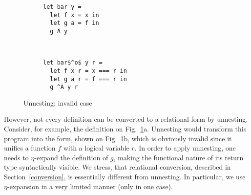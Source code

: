 \begin{figure}[t]
\centering
\begin{subfigure}[t]{0.4\textwidth}
 \centering
\begin{lstlisting}
let bar y =
  let f x = x in
  let g a = f in
  g A y
\end{lstlisting}
\vspace{-1\baselineskip}
    \caption{}
  \end{subfigure}
  ~
  \begin{subfigure}[t]{0.4\textwidth}
    \centering
\begin{lstlisting}
let bar$^o$ y r =
  let f x r = x === r in
  let g a r = f === r in
  g ^A y r
\end{lstlisting}
\vspace{-1\baselineskip}
  \caption{}
  \end{subfigure}
  \vskip2mm
\caption{Unnesting: invalid case}
\label{unnesting_invalid}
\end{figure}

However, not every definition can be converted to a relational form by unnesting. Consider, for example, the definition on Fig.~\ref{unnesting_invalid}a.
Unnesting would transform this program into the form, shown on Fig.~\ref{unnesting_invalid}b, which is obviously invalid since it unifies a
function $f$ with a logical variable $r$. In order to apply unnesting, one needs to $\eta$-expand the definition of $g$, making the functional nature of
its return type syntactically visible.
We stress, that relational conversion, described in Section~\ref{conversion}, is essentially different from unnesting. In particular, 
we use $\eta$-expansion in a very limited manner (only in one case).

\begin{comment}

and for the aforementioned example the result of relational
conversion looks as follows:

\begin{lstlisting}
   let bar$^o$ y =
     let f x = x in
     let g a = f in
     g (fun q. q === ^A) y
\end{lstlisting}

Note, the majority of definitions are left intact; the only difference with the functional version comes from the use of the constructor 
\lstinline|A|, which was transformed into a goal-returning function.

\end{comment}

